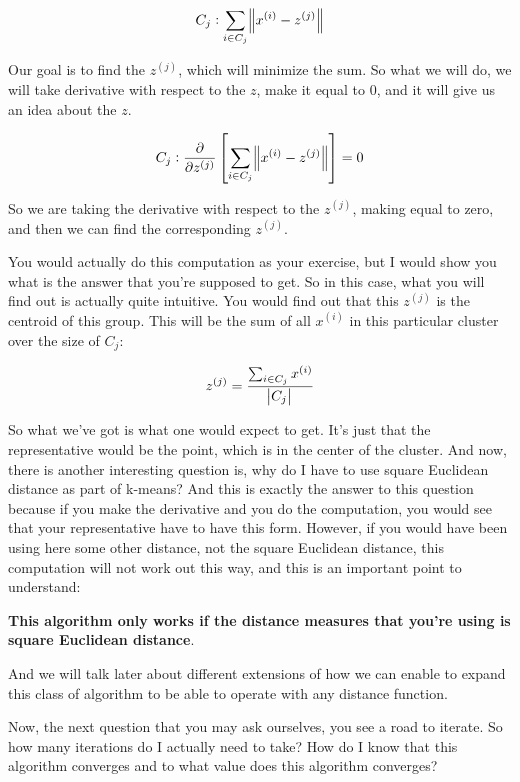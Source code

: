 \documentclass[a4paper, 12pt]{article}
\begin{document}
\begin{equation}
C_j: \sum_{i \in C_j} \norm{x^{(i)} - z^{(j)}}
\end{equation}

Our goal is to find the \(z^{(j)}\), which will minimize the sum. So what we
will do, we will take derivative with respect to the \(z\), make it equal to
\(0\), and it will give us an idea about the \(z\).

\begin{equation}
C_j: \frac{\partial}{\partial z^{(j)}} \left[\sum_{i \in C_j} \norm{x^{(i)} - z^{(j)}}\right] = 0
\end{equation}

So we are taking the derivative with respect to the \(z^{(j)}\), making equal to
zero, and then we can find the corresponding \(z^{(j)}\).

You would actually do this computation as your exercise, but I would show you
what is the answer that you're supposed to get. So in this case, what you will
find out is actually quite intuitive. You would find out that this \(z^{(j)}\)
is the centroid of this group. This will be the sum of all \(x^{(i)}\) in this
particular cluster over the size of \(C_j\):

\begin{equation}
z^{(j)} = \frac{\sum_{i \in C_j} x^{(i)}}{\abs{C_j}}
\end{equation}

So what we've got is what one would expect to get. It's just that the
representative would be the point, which is in the center of the cluster. And
now, there is another interesting question is, why do I have to use square
Euclidean distance as part of k-means? And this is exactly the answer to this
question because if you make the derivative and you do the computation, you
would see that your representative have to have this form. However, if you would
have been using here some other distance, not the square Euclidean distance,
this computation will not work out this way, and this is an important point to
understand:

\textbf{This algorithm only works if the distance measures that you're using is square
Euclidean distance}.

And we will talk later about different extensions of how we can enable to expand
this class of algorithm to be able to operate with any distance function.

Now, the next question that you may ask ourselves, you see a road to iterate. So
how many iterations do I actually need to take? How do I know that this
algorithm converges and to what value does this algorithm converges?
\end{document}
